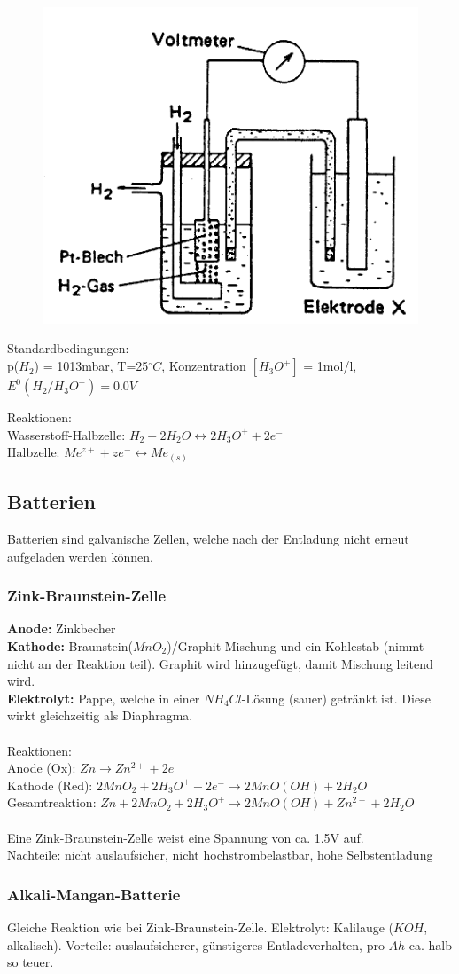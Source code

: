 \begin{figure}[htbp!]
	\centering
	\includegraphics[width=0.6\linewidth]{images/10_Wasserstoffelektrode.png}
\end{figure}

Standardbedingungen:\\
p($H_2$) = 1013mbar, T=25$^\circ C$, Konzentration $[H_3O^+]$ = 1mol/l, $E^0(H_2/H_3O^+) = 0.0V$

Reaktionen: \\
Wasserstoff-Halbzelle: $H_2 + 2H_2O \leftrightarrow 2 H_3O^+ + 2 e^-$ \\
Halbzelle: $Me^{z+} + z e^- \leftrightarrow Me_{(s)}$

\subsection{Batterien}
Batterien sind galvanische Zellen, welche nach der Entladung nicht erneut aufgeladen werden können.

\subsubsection{Zink-Braunstein-Zelle}
\textbf{Anode:} Zinkbecher\\
\textbf{Kathode:} Braunstein($MnO_2$)/Graphit-Mischung und ein Kohlestab (nimmt nicht an der Reaktion teil). Graphit wird hinzugefügt, damit Mischung leitend wird.\\ 
\textbf{Elektrolyt:} Pappe, welche in einer $NH_4Cl$-Lösung (sauer) getränkt ist. Diese wirkt gleichzeitig als Diaphragma.\\\\

Reaktionen: \\
Anode (Ox): $Zn \rightarrow Zn^{2+}+2e^-$\\
Kathode (Red): $2MnO_2+2H_3O^++2e^- \rightarrow 2MnO(OH)+2H_2O$\\
Gesamtreaktion: $Zn+2MnO_2+2H_3O^+ \rightarrow 2MnO(OH)+Zn^{2+}+2H_2O$\\\\
Eine Zink-Braunstein-Zelle weist eine Spannung von ca. 1.5V auf.\\

Nachteile: nicht auslaufsicher, nicht hochstrombelastbar, hohe Selbstentladung

\subsubsection{Alkali-Mangan-Batterie}
Gleiche Reaktion wie bei Zink-Braunstein-Zelle. Elektrolyt: Kalilauge ($KOH
$, alkalisch). Vorteile: auslaufsicherer, günstigeres Entladeverhalten, pro $Ah$ ca. halb so teuer.


